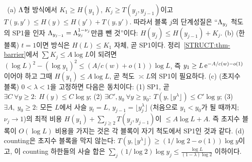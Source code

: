 \begin{proposition}\label{STRUCT:prop-escape}
\PROVED\ (a) $\Lambda$형 방식에서 $K_1\ge H(y_1)$, $K_j\ge T(y_j,y_{j-1})$이고 $T(y,y')\le H(y)\le H(y')+T(y,y')$. 따라서 블록 $j$의 단계성질은 ``$\Lambda_{y_j}$ 척도의 SP1을 인자 $\Lambda_{y_{j-1}}=\Lambda_{y_j}^{1-\nu_j}$만큼 뺀 것''이다: $H(y_j)\le H(y_{j-1})+K_j$.
(b) (한 블록) $t=1$이면 방식은 $H(L)\le K_1$ 자체, 곧 SP1이다. 정리~\ref{STRUCT:thm-barrier}에서 $\sum K_j\le A\log L$이 되려면 $(\log L)^2-(\log y_1)^2\le(A/c(w)+o(1))\log L$, 즉 $y_1\ge L\,\mathrm{e}^{-A/c(w)-o(1)}$이어야 하고 그때 $H(y_1)\le A\log L$, 곧 척도 $\asymp L$의 SP1이 필요하다.
(c) (초지수 블록) $0<\lambda<1$을 고정하면 다음은 동치이다:
(1) SP1, 곧 $\exists C\ \forall y\ge2:\ H(y)\le C\log y$;
(2) $\exists C',y_0\ \forall y\ge y_0:\ T(y,\lfloor y^\lambda\rfloor)\le C'\log y$;
(3) $\exists A,\ y_0\ge2$: 모든 $L$에서 사슬 $y_t=L$, $y_{j-1}=\lfloor y_j^\lambda\rfloor$ (처음으로 $y_1<y_0$가 될 때까지; $\nu_j\to1$)의 최적 비용 $H(y_1)+\sum_{j\ge2}T(y_j,y_{j-1})$이 $\le A\log L+A$.
즉 초지수 블록이 $O(\log L)$ 비용을 가지는 것은 각 블록이 자기 척도에서 SP1인 것과 같다.
(d) counting은 초지수 블록을 막지 않는다: $T(y,\lfloor y^\lambda\rfloor)\ge(1/\log2-o(1))\log y$이고, 이 counting 하한들의 사슬 합은 $\sum_j(1/\log 2)\log y_j\le\frac{\log L}{(1-\lambda)\log2}$ 이하이다.
\end{proposition}
